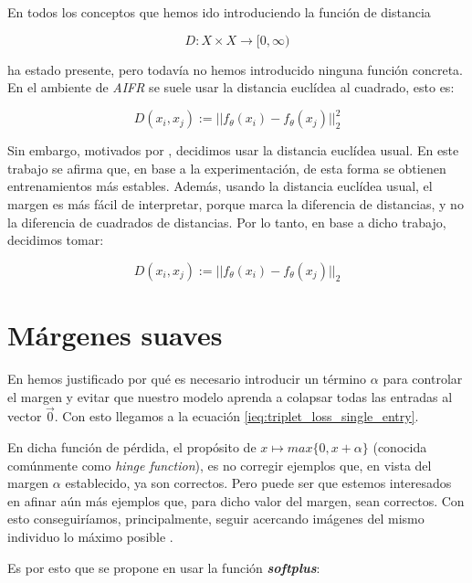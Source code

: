 En todos los conceptos que hemos ido introduciendo la función de distancia


\begin{equation}
    D: X \times X \to [0, \infty)
\end{equation}

ha estado presente, pero todavía no hemos introducido ninguna función concreta. En el ambiente de \textit{AIFR} se suele usar la distancia euclídea al cuadrado, esto es:

\begin{equation}
    D(x_i, x_j) := ||f_{\theta}(x_i) - f_{\theta}(x_j)||^2_2
\end{equation}

Sin embargo, motivados por \cite{informatica:principal}, decidimos usar la distancia euclídea usual. En este trabajo se afirma que, en base a la experimentación, de esta forma se obtienen entrenamientos más estables. Además, usando la distancia euclídea usual, el margen es más fácil de interpretar, porque marca la diferencia de distancias, y no la diferencia de cuadrados de distancias. Por lo tanto, en base a dicho trabajo, decidimos tomar:

\begin{equation}
        D(x_i, x_j) := ||f_{\theta}(x_i) - f_{\theta}(x_j)||_2
\end{equation}

\section{Márgenes suaves} \label{isec:margenes_suaves}

En  hemos justificado por qué es necesario introducir un término $\alpha$ para controlar el margen y evitar que nuestro modelo aprenda a colapsar todas las entradas al vector $\vec{0}$. Con esto llegamos a la ecuación \eqref{ieq:triplet_loss_single_entry}.

En dicha función de pérdida, el propósito de $x \mapsto max\{0, x + \alpha\}$ (conocida comúnmente como \textit{hinge function}), es no corregir ejemplos que, en vista del margen $\alpha$ establecido, ya son correctos. Pero puede ser que estemos interesados en afinar aún más ejemplos que, para dicho valor del margen, sean correctos. Con esto conseguiríamos, principalmente, seguir acercando imágenes del mismo individuo lo máximo posible \cite{informatica:principal}.

Es por esto que se propone en \cite{informatica:principal} usar la función \textbf{\textit{softplus}}:

